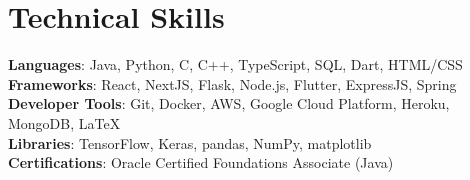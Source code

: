 \documentclass[letterpaper,11pt]{article}
\begin{document}
%
\section{Technical Skills}
 \begin{itemize}[leftmargin=0.15in, label={}]
    \small{\item{
     \textbf{Languages}{: Java, Python, C, C++, TypeScript, SQL, Dart, HTML/CSS} \\
     \textbf{Frameworks}{: React, NextJS, Flask, Node.js, Flutter, ExpressJS, Spring} \\
     \textbf{Developer Tools}{: Git, Docker, AWS, Google Cloud Platform, Heroku, MongoDB, \LaTeX} \\
     \textbf{Libraries}{: TensorFlow, Keras, pandas, NumPy, matplotlib} \\
     \textbf{Certifications}{: Oracle Certified Foundations Associate (Java)}
    }}
 \end{itemize}


\end{document}
